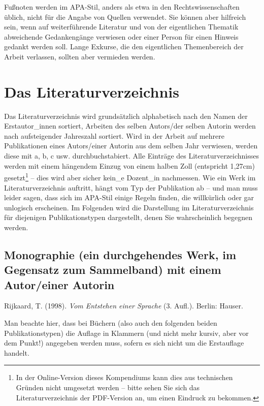 \documentclass[ngerman,bibliography=totoc,oneside,12pt,a4paper]{scrbook}
\begin{document}
Fußnoten werden im APA-Stil, anders als etwa in den Rechtswissenschaften
üblich, nicht für die Angabe von Quellen verwendet. Sie können aber
hilfreich sein, wenn auf weiterführende Literatur und von der
eigentlichen Thematik abweichende Gedankengänge verwiesen oder einer
Person für einen Hinweis gedankt werden soll. Lange Exkurse, die den
eigentlichen Themenbereich der Arbeit verlassen, sollten aber vermieden
werden.

\section{Das Literaturverzeichnis}\label{das-literaturverzeichnis}

Das Literaturverzeichnis wird grundsätzlich alphabetisch nach den Namen
der Erstautor\_innen sortiert, Arbeiten des selben Autors/der selben
Autorin werden nach aufsteigender Jahreszahl sortiert. Wird in der
Arbeit auf mehrere Publikationen eines Autors/einer Autorin aus dem
selben Jahr verwiesen, werden diese mit a, b, c usw. durchbuchstabiert.
Alle Einträge des Literaturverzeichnisses werden mit einem hängendem
Einzug von einem halben Zoll (entspricht 1{,}27cm) gesetzt\footnote{In
  der Online-Version dieses Kompendiums kann dies aus technischen
  Gründen nicht umgesetzt werden -- bitte sehen Sie sich das
  Literaturverzeichnis der PDF-Version an, um einen Eindruck zu
  bekommen.} -- dies wird aber sicher kein\_e Dozent\_in nachmessen. Wie
ein Werk im Literaturverzeichnis auftritt, hängt vom Typ der Publikation
ab -- und man muss leider sagen, dass sich im APA-Stil einige Regeln
finden, die willkürlich oder gar unlogisch erscheinen. Im Folgenden wird
die Darstellung im Literaturverzeichnis für diejenigen Publikationstypen
dargestellt, denen Sie wahrscheinlich begegnen werden.

\subsection*{Monographie (ein durchgehendes Werk, im Gegensatz zum
Sammelband) mit einem Autor/einer
Autorin}\label{monographie-ein-durchgehendes-werk-im-gegensatz-zum-sammelband-mit-einem-autoreiner-autorin}

Rijkaard, T. (1998). \emph{Vom Entstehen einer
Sprache} (3. Aufl.). Berlin: Hauser.

Man beachte hier, dass bei Büchern (also auch den folgenden beiden
Publikationstypen) die Auflage in Klammern (und nicht mehr kursiv, aber
vor dem Punkt!) angegeben werden muss, sofern es sich nicht um die
Erstauflage handelt.
\end{document}

